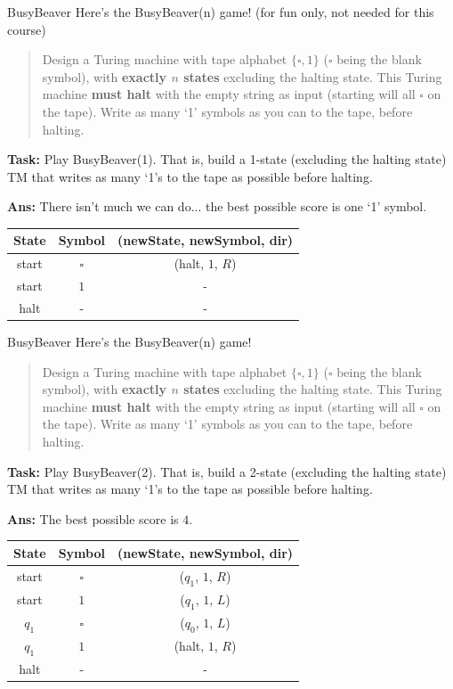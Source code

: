 \documentclass{beamer}
\begin{document}
\begin{frame}{BusyBeaver}
Here's the BusyBeaver(n) game! (for fun only, not needed for this course)
\begin{quote}
    Design a Turing machine with tape alphabet $\{\square, 1\}$ ($\square$ being the blank symbol), with \textbf{exactly $n$ states} excluding the halting state. This Turing machine \textbf{must halt} with the empty string as input (starting will all $\square$ on the tape). Write as many `1' symbols as you can to the tape, before halting.
\end{quote}

\textbf{Task:} Play BusyBeaver(1). That is, build a 1-state (excluding the halting state) TM that writes as many `1's to the tape as possible before halting.

\pause

\textbf{Ans:} There isn't much we can do... the best possible score is one `1' symbol.
\begin{center}
    \begin{tabular}{c|c|c}
        State & Symbol & (newState, newSymbol, dir) \\
        \hline
        start & $\square$ & (halt, $1$, $R$)\\
        start & $1$ & -\\
        halt & - & -
    \end{tabular}
\end{center}
\end{frame}


\begin{frame}{BusyBeaver}
Here's the BusyBeaver(n) game!
\begin{quote}
    Design a Turing machine with tape alphabet $\{\square, 1\}$ ($\square$ being the blank symbol), with \textbf{exactly $n$ states} excluding the halting state. This Turing machine \textbf{must halt} with the empty string as input (starting will all $\square$ on the tape). Write as many `1' symbols as you can to the tape, before halting.
\end{quote}

\textbf{Task:} Play BusyBeaver(2). That is, build a 2-state (excluding the halting state) TM that writes as many `1's to the tape as possible before halting.

\pause

\textbf{Ans:} The best possible score is $4$.
\begin{center}
    \begin{tabular}{c|c|c}
        State & Symbol & (newState, newSymbol, dir) \\
        \hline
        start & $\square$ & ($q_1$, $1$, $R$)\\
        start & $1$ & ($q_1$, $1$, $L$)\\
        $q_1$ & $\square$ & ($q_0$, $1$, $L$)\\
        $q_1$ & $1$ & (halt, $1$, $R$)\\
        halt & - & -
    \end{tabular}
\end{center}
\end{frame}
\end{document}
